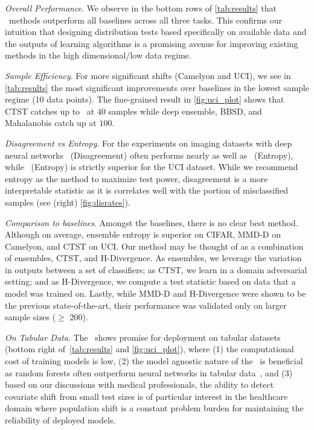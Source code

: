 \textit{Overall Performance}.
We observe in the bottom rows of \autoref{tab:results} that \method\ methods outperform all baselines across all three tasks.
This confirms our intuition that designing distribution tests based specifically on available data and the outputs of learning algorithms is a promising avenue for improving existing methods in the high dimensional/low data regime.

\textit{Sample Efficiency}.
For more significant shifts (Camelyon and UCI), we see in \autoref{tab:results} the most significant improvements over baselines in the lowest sample regime (10 data points).
The fine-grained result in \autoref{fig:uci_plot} shows that CTST catches up to \method\ at $40$ samples while deep ensemble, BBSD, and Mahalanobis catch up at $100$.

\textit{Disagreement vs Entropy}.
For the experiments on imaging datasets with deep neural networks \method\ (Disagreement) often performs nearly as well as \method\ (Entropy),
while \method\ (Entropy) is strictly superior for the UCI dataset.
While we recommend entropy as the method to maximize test power, disagreement is a more interpretable statistic as it is correlates well with the portion of misclassified samples (see (right) \autoref{fig:disrates}).

\textit{Comparison to baselines}.
Amongst the baselines, there is no clear best method. Although on average, ensemble entropy is superior on CIFAR, MMD-D on Camelyon, and CTST on UCI. Our method may be thought of as a combination of ensembles, CTST, and H-Divergence. As ensembles, we leverage the variation in outputs between a set of classifiers; as CTST, we learn in a domain adversarial setting; and as H-Divergence, we compute a test statistic based on data that a model was trained on.
Lastly, while MMD-D and H-Divergence were shown to be the previous state-of-the-art, their performance was validated only on larger sample sizes ($\geq$ 200).

\textit{On Tabular Data}.
The \method\ shows promise for deployment on tabular datasets (bottom right of\ \autoref{tab:results} and \autoref{fig:uci_plot}),
where (1) the computational cost of training models is low, (2) the model agnostic nature of the \method\ is beneficial as random forests often outperform neural networks in tabular data~\citep{tabdatasurvey}, and
(3) based on our discussions with medical professionals, the ability to detect covariate shift from small test sizes is of particular interest in the healthcare domain
where population shift is a constant problem burden for maintaining the reliability of deployed models.

